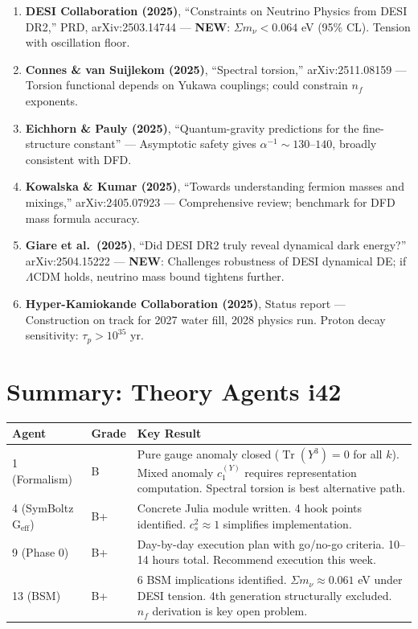 \documentclass[11pt,a4paper]{article}
\newcommand{\NEW}{\textcolor{dfdblue}{\textbf{NEW}}}
\newcommand{\Tr}{\operatorname{Tr}}
\begin{document}
\begin{enumerate}
\item \textbf{DESI Collaboration (2025)}, ``Constraints on Neutrino Physics from DESI DR2,'' PRD, arXiv:2503.14744 --- \NEW: $\Sigma m_\nu < 0.064$ eV (95\% CL). Tension with oscillation floor.

\item \textbf{Connes \& van Suijlekom (2025)}, ``Spectral torsion,'' arXiv:2511.08159 --- Torsion functional depends on Yukawa couplings; could constrain $n_f$ exponents.

\item \textbf{Eichhorn \& Pauly (2025)}, ``Quantum-gravity predictions for the fine-structure constant'' --- Asymptotic safety gives $\alpha^{-1} \sim 130$--$140$, broadly consistent with DFD.

\item \textbf{Kowalska \& Kumar (2025)}, ``Towards understanding fermion masses and mixings,'' arXiv:2405.07923 --- Comprehensive review; benchmark for DFD mass formula accuracy.

\item \textbf{Giare et al.\ (2025)}, ``Did DESI DR2 truly reveal dynamical dark energy?'' arXiv:2504.15222 --- \NEW: Challenges robustness of DESI dynamical DE; if $\Lambda$CDM holds, neutrino mass bound tightens further.

\item \textbf{Hyper-Kamiokande Collaboration (2025)}, Status report --- Construction on track for 2027 water fill, 2028 physics run. Proton decay sensitivity: $\tau_p > 10^{35}$ yr.
\end{enumerate}


\section*{Summary: Theory Agents i42}

\begin{center}
\begin{tabular}{llp{8cm}}
\toprule
\textbf{Agent} & \textbf{Grade} & \textbf{Key Result} \\
\midrule
1 (Formalism) & B & Pure gauge anomaly closed ($\Tr(Y^3)=0$ for all $k$). Mixed anomaly $c_1^{(Y)}$ requires representation computation. Spectral torsion is best alternative path. \\
4 (SymBoltz G$_{\mathrm{eff}}$) & B+ & Concrete Julia module written. 4 hook points identified. $c_s^2 \approx 1$ simplifies implementation. \\
9 (Phase 0) & B+ & Day-by-day execution plan with go/no-go criteria. 10--14 hours total. Recommend execution this week. \\
13 (BSM) & B+ & 6 BSM implications identified. $\Sigma m_\nu \approx 0.061$ eV under DESI tension. 4th generation structurally excluded. $n_f$ derivation is key open problem. \\
\bottomrule
\end{tabular}
\end{center}
\end{document}
